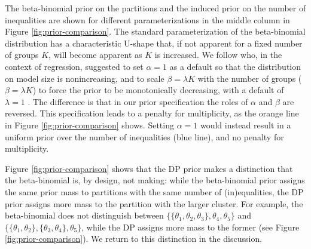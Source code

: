 \documentclass[11pt,a4paper]{article}
\theoremstyle{definition} %
\theoremstyle{case}
\begin{document}
The beta-binomial prior on the partitions and the induced prior on the number of inequalities are shown for different parameterizations in the middle column in Figure \ref{fig:prior-comparison}. The standard parameterization of the beta-binomial distribution has a characteristic U-shape that, if not apparent for a fixed number of groups $K$, will become apparent as $K$ is increased. We follow \textcite{wilson2010bayesian} who, in the context of regression, suggested to set $\alpha = 1$ as a default so that the distribution on model size is nonincreasing, and to scale $\beta = \lambda K$ with the number of groups ($\beta = \lambda K$) to force the prior to be monotonically decreasing, with a default of $\lambda = 1$ \parencite{wilson2010bayesian}. The difference is that in our prior specification the roles of $\alpha$ and $\beta$ are reversed. This specification leads to a penalty for multiplicity, as the orange line in Figure \ref{fig:prior-comparison} shows. Setting $\alpha = 1$ would instead result in a uniform prior over the number of inequalities (blue line), and no penalty for multiplicity.

Figure \ref{fig:prior-comparison} shows that the DP prior makes a distinction that the beta-binomial is, by design, not making: while the beta-binomial prior assigns the same prior mass to partitions with the same number of (in)equalities, the DP prior assigns more mass to the partition with the larger cluster. For example, the beta-binomial does not distinguish between $\{\{\theta_1, \theta_2, \theta_3\}, \theta_4, \theta_5\}$ and $\{\{\theta_1, \theta_2\}, \{\theta_3, \theta_4\}, \theta_5\}$, while the DP assigns more mass to the former (see Figure \ref{fig:prior-comparison}). We return to this distinction in the discussion.
\end{document}

